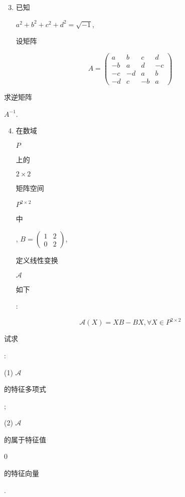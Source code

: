 \documentclass[10pt]{article}
\begin{document}
\begin{enumerate}
  \setcounter{enumi}{2}
  \item \begin{CJK}{UTF8}{mj}已知\end{CJK} $a^{2}+b^{2}+c^{2}+d^{2}=\sqrt{-1}$, \begin{CJK}{UTF8}{mj}设矩阵\end{CJK}
\end{enumerate}
$$
A=\left(\begin{array}{cccc}
a & b & c & d \\
-b & a & d & -c \\
-c & -d & a & b \\
-d & c & -b & a
\end{array}\right)
$$
\begin{CJK}{UTF8}{mj}求逆矩阵\end{CJK} $A^{-1}$.

\begin{enumerate}
  \setcounter{enumi}{3}
  \item \begin{CJK}{UTF8}{mj}在数域\end{CJK} $P$ \begin{CJK}{UTF8}{mj}上的\end{CJK} $2 \times 2$ \begin{CJK}{UTF8}{mj}矩阵空间\end{CJK} $P^{2 \times 2}$ \begin{CJK}{UTF8}{mj}中\end{CJK}, $B=\left(\begin{array}{ll}1 & 2 \\ 0 & 2\end{array}\right)$, \begin{CJK}{UTF8}{mj}定义线性变换\end{CJK} $\mathscr{A}$ \begin{CJK}{UTF8}{mj}如下\end{CJK}:
\end{enumerate}
$$
\mathscr{A}(X)=X B-B X, \forall X \in P^{2 \times 2}
$$
\begin{CJK}{UTF8}{mj}试求\end{CJK}:

(1) $\mathscr{A}$ \begin{CJK}{UTF8}{mj}的特征多项式\end{CJK};

(2) $\mathscr{A}$ \begin{CJK}{UTF8}{mj}的属于特征值\end{CJK} 0 \begin{CJK}{UTF8}{mj}的特征向量\end{CJK}.
\end{document}
